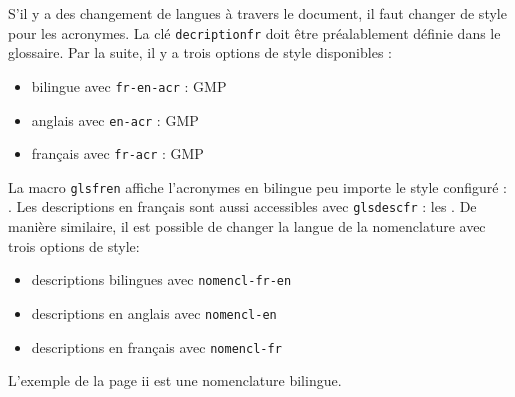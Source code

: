 \documentclass[PhD,nohyperref,english,french]{ulthese}
\begin{document}
S'il y a des changement de langues à travers le document, il faut changer de style pour les acronymes. La clé \texttt{decriptionfr} doit être préalablement définie dans le glossaire. Par la suite, il y a trois options de style disponibles : 
\begin{itemize}
 \item bilingue  avec \texttt{fr-en-acr}  : \acrfull{GMP}
 \item anglais avec \texttt{en-acr} : \acrfull{GMP}
  \item français avec \texttt{fr-acr} : \acrfull{GMP}
\end{itemize}
La macro \texttt{glsfren} affiche l'acronymes en bilingue peu importe le style configuré : . Les descriptions en français sont aussi accessibles avec \texttt{glsdescfr} : les . De manière similaire, il est possible de changer la langue de la nomenclature avec trois options de style:
\begin{itemize}
\item descriptions bilingues avec \texttt{nomencl-fr-en}
\item descriptions en anglais avec \texttt{nomencl-en}
\item descriptions en français avec \texttt{nomencl-fr}
\end{itemize}
L'exemple de la page ii est une nomenclature bilingue.
\end{document}
